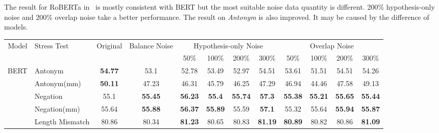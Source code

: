 The result for RoBERTa in~ is mostly consistent with BERT but the 
most suitable noise data quantity is different. 200\% hypothesis-only noise and 200\% overlap noise 
take a better performance. The result on \textit{Antonym} is also improved. It may be caused by the difference of 
models.

\begin{table}[]
	\centering
	\scriptsize
\begin{tabular}{|c|l|c|c|c|c|c|c|c|c|c|c|}
\hline
\multirow{2}{*}{Model}                          & \multirow{2}{*}{Stress Test} & \multirow{2}{*}{Original} & \multirow{2}{*}{Balance Noise} & \multicolumn{4}{c|}{Hypothesis-only Noise}                        & \multicolumn{4}{c|}{Overlap Noise}                                \\ \cline{5-12} 
                                                &                              &                           &                                & 50\%           & 100\%          & 200\%          & 300\%          & 50\%           & 100\%          & 200\%          & 300\%          \\ \hline
\multirow{11}{*}{BERT}                          & Antonym                      & \textbf{54.77}            & 53.1                  & 52.78 & 53.49 & 52.97& 54.51 & 53.61 & 51.51          & 54.51 & 54.26 \\ \cline{2-12} 
                                                & Antonym(mm)                  & \textbf{50.11}            & 47.23                 & 46.31 & 45.79 & 46.25 & 47.29 & 46.94 & 44.46          & 47.58 & 49.13 \\ \cline{2-12} 
                                                & Negation                     & 55.1                      & \textbf{55.45}                 & \textbf{56.23} & \textbf{55.4}  & \textbf{55.74} & \textbf{57.3}  & \textbf{55.38} & \textbf{55.21} & \textbf{55.65} & \textbf{55.44} \\ \cline{2-12} 
                                                & Negation(mm)                 & 55.64                     & \textbf{55.88}                 & \textbf{56.37} & \textbf{55.89} & 55.59 & \textbf{57.1}  & 55.32 &55.64 & \textbf{55.94} & \textbf{55.87} \\ \cline{2-12} 
                                                & Length Mismatch              & 80.86                     & 80.34                 & \textbf{81.23} & 80.65          & 80.83          & \textbf{81.19} & \textbf{80.89} & 80.82          & 80.86 & \textbf{81.09} \\ \cline{2-12} 

\end{tabular}
\end{table}

